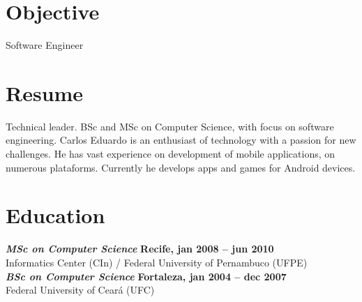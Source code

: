 \documentclass[margin, 10pt]{res} %
\begin{document}
\begin{resume}

 \vspace{-0.05in}
\section{Objective}  

Software Engineer

 
\section{Resume}  

Technical leader. BSc and MSc on Computer Science, with focus on software engineering. Carlos Eduardo is an enthusiast of technology with a passion for new challenges. He has vast experience on development of mobile applications, on numerous plataforms. Currently he develops apps and games for Android devices.


\section{Education}

{\sl\bf MSc on Computer Science} \hfill {\bf Recife, jan 2008 -- jun 2010} \\
Informatics Center (CIn) / Federal University of Pernambuco (UFPE) %
\vspace{0.1in}
\\{\sl\bf BSc on Computer Science} \hfill {\bf Fortaleza, jan 2004 -- dec 2007} \\
Federal University of Ceará (UFC)  
 
 

 

\end{resume}
\end{document}
